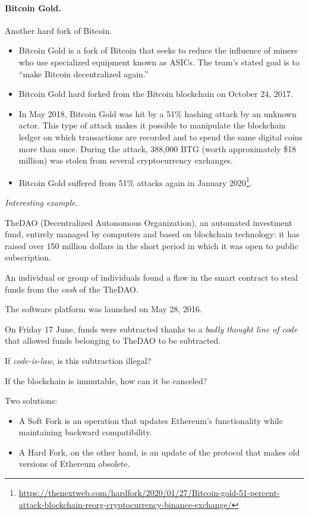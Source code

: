 \paragraph*{Bitcoin Gold.}
Another hard fork of Bitcoin.
\begin{itemize}
	\item Bitcoin Gold is a fork of Bitcoin that seeks to reduce the influence of miners who use specialized equipment known as ASICs. The team’s stated goal is to ``make Bitcoin decentralized again.''
	\item Bitcoin Gold hard forked from the Bitcoin blockchain on October 24, 2017.
	\item In May 2018, Bitcoin Gold was hit by a 51\% hashing attack by an unknown actor. This type of attack makes it possible to manipulate the blockchain ledger on which transactions are recorded and to spend the same digital coins more than once. During the attack, 388,000 BTG (worth approximately \$18 million) was stolen from several cryptocurrency exchanges. 
	\item Bitcoin Gold suffered from 51\% attacks again in January 2020\footnote{{\scriptsize\url{https://thenextweb.com/hardfork/2020/01/27/Bitcoin-gold-51-percent-attack-blockchain-reorg-cryptocurrency-binance-exchange/}}}.
\end{itemize}

\textit{Interesting example.}

TheDAO (Decentralized Autonomous Organization), an automated investment fund, entirely managed by computers and based on blockchain technology: it has raised over 150 million dollars in the short period in which it was open to public subscription.

An individual or group of individuals found a flaw in the smart contract to steal funds from the \textit{cash} of the TheDAO.

The software platform was launched on May 28, 2016.

On Friday 17 June, funds were subtracted thanks to a \textit{badly thought line of code} that allowed funds belonging to TheDAO to be subtracted.

If \textit{code-is-law}, is this subtraction illegal?

If the blockchain is immutable, how can it be canceled?

Two solutions:
\begin{itemize}
	\item A Soft Fork is an operation that updates Ethereum's functionality while maintaining backward compatibility.
	\item A Hard Fork, on the other hand, is an update of the protocol that makes old versions of Ethereum obsolete.
\end{itemize}

